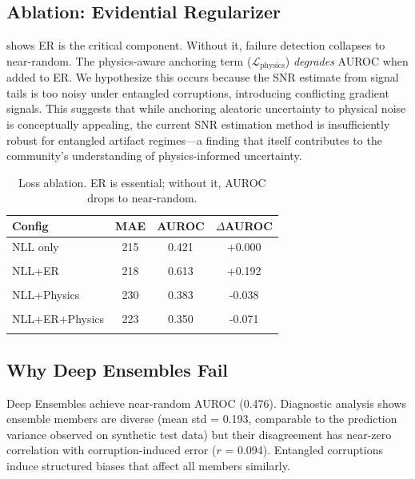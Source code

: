 \documentclass[11pt,a4paper]{article}
\begin{document}
\subsection{Ablation: Evidential Regularizer}

 shows ER is the critical component. Without it, failure detection collapses to near-random. The physics-aware anchoring term ($\mathcal{L}_{\text{physics}}$) \emph{degrades} AUROC when added to ER. We hypothesize this occurs because the SNR estimate from signal tails is too noisy under entangled corruptions, introducing conflicting gradient signals. This suggests that while anchoring aleatoric uncertainty to physical noise is conceptually appealing, the current SNR estimation method is insufficiently robust for entangled artifact regimes---a finding that itself contributes to the community's understanding of physics-informed uncertainty.

\begin{table}[H]
  \centering
  \caption{Loss ablation. ER is essential; without it, AUROC drops to near-random.}
  \label{tab:ablation}
  \begin{tabular}{@{}lccc@{}}
    \toprule
    \textbf{Config} & \textbf{MAE} & \textbf{AUROC} & \textbf{$\Delta$AUROC} \\
    \midrule
    NLL only & 215 & 0.421 & +0.000 \\\\
    NLL+ER & 218 & 0.613 & +0.192 \\\\
    NLL+Physics & 230 & 0.383 & -0.038 \\\\
    NLL+ER+Physics & 223 & 0.350 & -0.071 \\\\
    \bottomrule
  \end{tabular}
\end{table}

\subsection{Why Deep Ensembles Fail}

Deep Ensembles achieve near-random AUROC (0.476). Diagnostic analysis shows ensemble members are diverse (mean std = 0.193, comparable to the prediction variance observed on synthetic test data) but their disagreement has near-zero correlation with corruption-induced error ($r$ = 0.094). Entangled corruptions induce structured biases that affect all members similarly.
\end{document}

